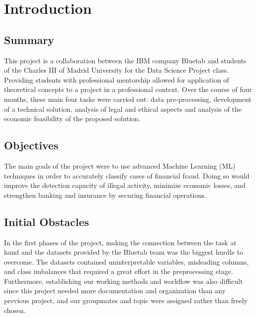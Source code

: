 \documentclass[12pt]{report} %
\begin{document}
\tableofcontents
\thispagestyle{fancy}







\clearpage
{} %


\chapter{Introduction}
\section{Summary}
This project is a collaboration between the IBM company Bluetab and  students of the Charles III of Madrid University for the Data Science Project class. Providing students with professional mentorship allowed for application of theoretical concepts to a project in a professional context. Over the course of four months, these main four tasks were carried out: data pre-processing, development of a technical solution, analysis of legal and ethical aspects and analysis of the economic feasibility of the proposed solution.

\section{Objectives}
The main goals of the project were to use advanced Machine Learning (ML) techniques in order to accurately classify cases of financial fraud. Doing so would improve the detection capacity of illegal activity, minimize economic losses, and strengthen banking and insurance by securing financial operations.

\section{Initial Obstacles}
In the first phases of the project, making the connection between the task at hand and the datasets provided by the Bluetab team was the biggest hurdle to overcome. The datasets contained uninterpretable variables, misleading columns, and class imbalances that required a great effort in the preprocessing stage. Furthermore, establishing our working methods and workflow was also difficult since this project needed more documentation and organization than any previous project, and our groupmates and topic were assigned rather than freely chosen.
\end{document}

